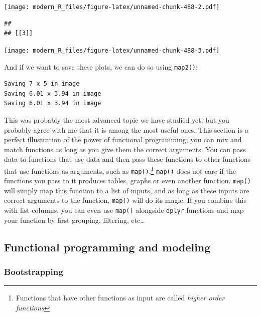 \documentclass[]{gitbook}
\newenvironment{Shaded}{\begin{snugshade}}{\end{snugshade}}
\newcommand{\KeywordTok}[1]{\textcolor[rgb]{0.13,0.29,0.53}{\textbf{#1}}}
\newcommand{\NormalTok}[1]{#1}
\newcommand{\OperatorTok}[1]{\textcolor[rgb]{0.81,0.36,0.00}{\textbf{#1}}}
\newcommand{\StringTok}[1]{\textcolor[rgb]{0.31,0.60,0.02}{#1}}
\let\rmarkdownfootnote\footnote%
\def\footnote{\protect\rmarkdownfootnote}
\theoremstyle{definition}
\theoremstyle{definition}
\theoremstyle{definition}
\theoremstyle{remark}
\begin{document}
\texttt{[image: modern\_R\_files/figure-latex/unnamed-chunk-488-2.pdf]}

\begin{verbatim}
## 
## [[3]]
\end{verbatim}

\texttt{[image: modern\_R\_files/figure-latex/unnamed-chunk-488-3.pdf]}

And if we want to save these plots, we can do so using \texttt{map2()}:

\begin{Shaded}
\end{Shaded}

\begin{verbatim}
Saving 7 x 5 in image
Saving 6.01 x 3.94 in image
Saving 6.01 x 3.94 in image
\end{verbatim}

This was probably the most advanced topic we have studied yet; but you
probably agree with me that it is among the most useful ones. This
section is a perfect illustration of the power of functional
programming; you can mix and match functions as long as you give them
the correct arguments. You can pass data to functions that use data and
then pass these functions to other functions that use functions as
arguments, such as \texttt{map()}.\footnote{Functions that have other
  functions as input are called \emph{higher order functions}}
\texttt{map()} does not care if the functions you pass to it produces
tables, graphs or even another function. \texttt{map()} will simply map
this function to a list of inputs, and as long as these inputs are
correct arguments to the function, \texttt{map()} will do its magic. If
you combine this with list-columns, you can even use \texttt{map()}
alongside \texttt{dplyr} functions and map your function by first
grouping, filtering, etc\ldots{}

\hypertarget{functional-programming-and-modeling}{%
\subsection{Functional programming and
modeling}\label{functional-programming-and-modeling}}

\hypertarget{bootstrapping}{%
\subsubsection{Bootstrapping}\label{bootstrapping}}
\end{document}
